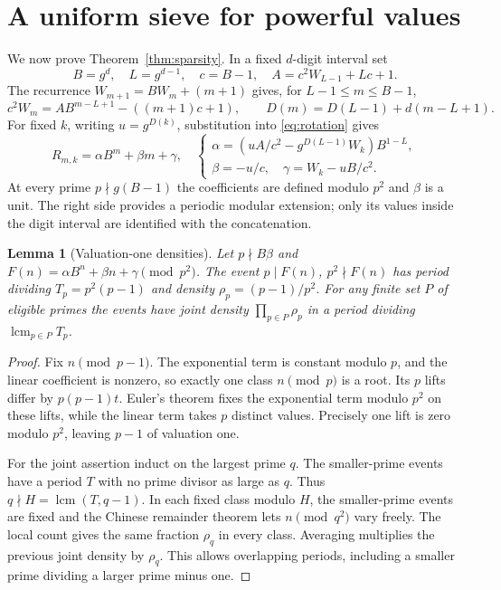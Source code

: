 \documentclass[10pt]{article}
\newtheorem{lemma}{Lemma}
\begin{document}
\section{A uniform sieve for powerful values}\label{sec:sieve}
We now prove Theorem~\ref{thm:sparsity}. In a fixed $d$-digit interval set
\[
 B=g^d,\quad L=g^{d-1},\quad c=B-1,\quad
 A=c^2W_{L-1}+Lc+1.
\]
The recurrence $W_{m+1}=BW_m+(m+1)$ gives, for $L-1\le m\le B-1$,
\[
 c^2W_m=A B^{m-L+1}-((m+1)c+1),\qquad
 D(m)=D(L-1)+d(m-L+1).
\]
For fixed $k$, writing $u=g^{D(k)}$, substitution into
\eqref{eq:rotation} gives
\begin{equation}\label{eq:affine}
 R_{m,k}=\alpha B^m+\beta m+\gamma,
\quad
 \begin{cases}
 \alpha=(uA/c^2-g^{D(L-1)}W_k)B^{1-L},\\
 \beta=-u/c,\quad\gamma=W_k-uB/c^2.
 \end{cases}
\end{equation}
At every prime $p\nmid g(B-1)$ the coefficients are defined modulo $p^2$
and $\beta$ is a unit. The right side provides a periodic modular extension;
only its values inside the digit interval are identified with the concatenation.

\begin{lemma}[Valuation-one densities]\label{lem:densities}
Let $p\nmid B\beta$ and $F(n)=\alpha B^n+\beta n+\gamma\pmod{p^2}$.
The event $p\mid F(n)$, $p^2\nmid F(n)$ has period dividing
$T_p=p^2(p-1)$ and density $\rho_p=(p-1)/p^2$.
For any finite set $P$ of eligible primes the events have joint density
$\prod_{p\in P}\rho_p$ in a period dividing $\operatorname{lcm}_{p\in P}T_p$.
\end{lemma}
\begin{proof}
Fix $n\pmod{p-1}$. The exponential term is constant modulo $p$, and the
linear coefficient is nonzero, so exactly one class $n\pmod p$ is a root.
Its $p$ lifts differ by $p(p-1)t$. Euler's theorem fixes the exponential
term modulo $p^2$ on these lifts, while the linear term takes $p$ distinct
values. Precisely one lift is zero modulo $p^2$, leaving $p-1$ of valuation one.

For the joint assertion induct on the largest prime $q$.
The smaller-prime events have a period $T$ with no prime divisor as large
as $q$. Thus $q\nmid H=\operatorname{lcm}(T,q-1)$.
In each fixed class modulo $H$, the smaller-prime events are fixed and
the Chinese remainder theorem lets $n\pmod{q^2}$ vary freely. The local
count gives the same fraction $\rho_q$ in every class. Averaging multiplies
the previous joint density by $\rho_q$. This allows overlapping periods,
including a smaller prime dividing a larger prime minus one.
\end{proof}
\end{document}
